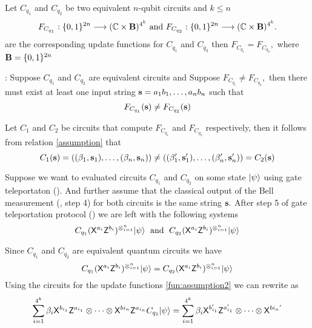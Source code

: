 \begin{lemma}
\label{lemma:nqubit}
Let $C_{q_1}$ and $C_{q_2}$ be two equivalent $n$-qubit circuits  and $k\leq n$
\begin{equation*}
 F_{C_{q_1}}:\{0,1\}^{2n}\longrightarrow  (\mathbb{C} \times {\bf B})^{4^k} \mbox{ and }
  F_{C_{q_2}}:\{0,1\}^{2n}\longrightarrow  (\mathbb{C} \times {\bf B})^{4^k}. 
\end{equation*}
are the corresponding update functions for $C_{q_1}$ and $C_{q_2}$  then $F_{C_{q_1}}=F_{C_{q_2}},$ where ${\bf B}=\{0,1\}^{2n}$
\end{lemma}

: Suppose $C_{q_1}$ and $C_{q_2}$ are equivalent circuits and Suppose $F_{C_{q_1}}\neq F_{C_{q_2}},$  then there must exist at least one input string ${\bf s}=a_1b_1,\ldots, a_nb_n$ such that
\begin{equation}
\label{assumption}
F_{C_{q_1}}({\bf s})\neq F_{C_{q_2}}({\bf s})
\end{equation}

Let $C_1$ and $C_2$ be circuits that compute $F_{C_{q_1}}$ and $F_{C_{q_2}}$ respectively, then it follows from relation \ref{assumption} that
\begin{equation}
\label{fun:assumption2}
C_1({\bf s)}=((\beta_1, {\bf s}_1),\ldots, (\beta_n, {\bf s}_n))\neq ((\beta_1^\prime, {\bf s}_1^\prime),\ldots, (\beta_n^\prime, {\bf s}_n^\prime))=C_2({\bf s})
\end{equation}

Suppose we want to evaluated circuits $C_{q_1}$ and $C_{q_2}$ on some state ${\lvert}\psi\rangle$ using gate teleportaton (). And further assume that the classical output of the Bell measurement (, step 4) for both circuits is the same string ${\bf s}.$ After step 5 of  gate teleportation protocol () we are left with the following systems
 \begin{equation*}
C_{q_1} ({\sf X}^{a_{i}}{\sf Z}^{b_{i}})^{\otimes_{i=1}^{n}}{\lvert}\psi\rangle \;\mbox{ and }\;
C_{q_2} ({\sf X}^{a_{i}}{\sf Z}^{b_{i}})^{\otimes_{i=1}^{n}}{\lvert}\psi\rangle
\end{equation*}

Since $C_{q_1}$ and $C_{q_2}$ are equivalent quantum circuits we have
 \begin{equation}
 \label{nqubit:eq10}
C_{q_1} ({\sf X}^{a_{i}}{\sf Z}^{b_{i}})^{\otimes_{i=1}^{n}}{\lvert}\psi\rangle=C_{q_2} ({\sf X}^{a_{i}}{\sf Z}^{b_{i}})^{\otimes_{i=1}^{n}}{\lvert}\psi\rangle
\end{equation}
Using the circuits for the update functions \ref{fun:assumption2} we can rewrite  as
\begin{equation}
 \label{nqubit:eq11}
\sum_{i=1}^{4^k} \beta_i {\sf X}^{b_{i_1}} {\sf Z}^{a_{i_1}}\otimes \cdots \otimes {\sf X}^{b{i_n}} {\sf Z}^{a_{i_n}}C_{q_1}{\lvert}\psi\rangle=\sum_{i=1}^{4^k} \beta_i {\sf X}^{b_{i_1}^\prime} {\sf Z}^{a_{i_1}^\prime}\otimes \cdots \otimes {\sf X}^{b{i_n}^\prime} 
\end{equation}

